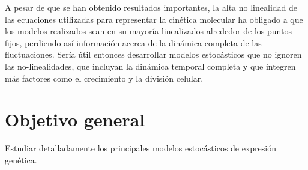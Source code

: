 A pesar de que se han obtenido resultados importantes, la alta no linealidad de las ecuaciones utilizadas para representar la cin\'etica molecular ha obligado a que los modelos realizados sean en su mayor\'ia linealizados alrededor de los puntos fijos, perdiendo as\'i informaci\'on acerca de la din\'amica completa de las fluctuaciones. Ser\'ia \'util entonces desarrollar modelos estoc\'asticos que no ignoren las no-linealidades, que incluyan la din\'amica temporal completa y que integren m\'as factores como el crecimiento y la divisi\'on celular.

\section{Objetivo general}

Estudiar detalladamente los principales modelos estoc\'asticos de expresi\'on gen\'etica.
